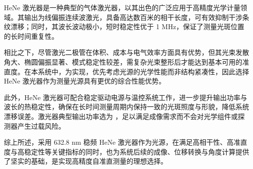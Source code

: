 HeNe 激光器是一种典型的气体激光器，以其出色的广泛应用于高精度光学计量领域。其输出为线偏振连续波激光，具备高达数百米的相干长度，可有效抑制干涉条纹漂移；同时，其波长波动极小，短时稳定性优于 1 MHz，保证了测量光斑位置的长时间重复性。

相比之下，尽管激光二极管在体积、成本与电气效率方面具有优势，但其光束发散角大、椭圆偏振显著、模式稳定性较差，需复杂光束整形后才能达到基本可用的准直度。在本系统中，为实现，优先考虑光源的光学性能而非结构紧凑性，因此选择 HeNe 激光器作为测量光源具有更优的综合性能优势。

此外，HeNe 激光器可配合稳定驱动电源与温控系统工作，进一步提升输出功率与波长的热稳定性，确保在长时间测量周期内保持一致的光斑照度与形貌，降低系统漂移误差。激光器典型输出功率选为 ，足以满足成像需求而不会对光学组件或探测器产生过载风险。

综上所述，采用 632.8 nm 稳频 HeNe 激光器作为光源，在满足高相干性、高准直度与高稳定性等关键指标的同时，也为系统后续的成像、位移转换与角度计算提供了坚实的基础，是实现高精度自准直测量的理想选择。

